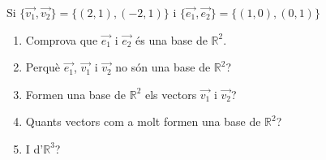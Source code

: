 \Exercise Si $\{\overrightarrow{v_1},\overrightarrow{v_2}\} = \{ (2,1),(-2,1) \}$ i $\{\overrightarrow{e_1},\overrightarrow{e_2}\} = \{ (1,0),(0,1) \}$
\begin{enumerate}
  \item Comprova que $\overrightarrow{e_1}$ i $\overrightarrow{e_2}$ és una base de $\mathbb{R}^2$.
  \item Perquè $\overrightarrow{e_1}$, $\overrightarrow{v_1}$ i $\overrightarrow{v_2}$ no són una base de $\mathbb{R}^2$?
  \item Formen una base de $\mathbb{R}^2$ els vectors $\overrightarrow{v_1}$ i $\overrightarrow{v_2}$?
  \item Quants vectors com a molt formen una base de $\mathbb{R}^2$?
  \item I d'$\mathbb{R}^3$?
\end{enumerate}

